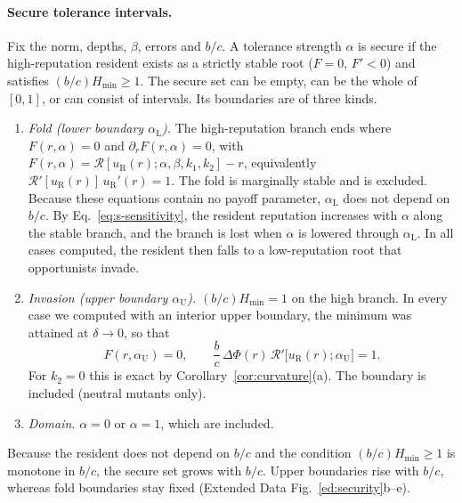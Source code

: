 \documentclass[fleqn,10pt]{wlscirep}
\newcommand{\Rmap}{\mathscr{R}}            %
\newcommand{\Hmin}{H_{\min}}
\theoremstyle{plain}
\begin{document}
\paragraph{Secure tolerance intervals.} Fix the norm, depths, $\beta$, errors and $b/c$. A tolerance strength $\alpha$ is secure if the high-reputation resident exists as a strictly stable root ($F=0$, $F'<0$) and satisfies $(b/c)\Hmin\geq1$. The secure set can be empty, can be the whole of $[0,1]$, or can consist of intervals. Its boundaries are of three kinds.
\begin{enumerate}
\item \textit{Fold (lower boundary $\alpha_{\mathrm L}$).} The high-reputation branch ends where $F(r,\alpha)=0$ and $\partial_rF(r,\alpha)=0$, with $F(r,\alpha)=\Rmap[u_{\mathrm R}(r);\alpha,\beta,k_1,k_2]-r$, equivalently $\Rmap'[u_{\mathrm R}(r)]\,u_{\mathrm R}'(r)=1$. The fold is marginally stable and is excluded. Because these equations contain no payoff parameter, $\alpha_{\mathrm L}$ does not depend on $b/c$. By Eq.~\eqref{eq:s-sensitivity}, the resident reputation increases with $\alpha$ along the stable branch, and the branch is lost when $\alpha$ is lowered through $\alpha_{\mathrm L}$. In all cases computed, the resident then falls to a low-reputation root that opportunists invade.
\item \textit{Invasion (upper boundary $\alpha_{\mathrm U}$).} $(b/c)\Hmin=1$ on the high branch. In every case we computed with an interior upper boundary, the minimum was attained at $\delta\to0$, so that
\begin{equation}
F(r,\alpha_{\mathrm U})=0,\qquad \frac{b}{c}\,\Delta\Phi(r)\,\Rmap'\bigl[u_{\mathrm R}(r);\alpha_{\mathrm U}\bigr]=1.
\label{eq:s-upper}
\end{equation}
For $k_2=0$ this is exact by Corollary~\ref{cor:curvature}(a). The boundary is included (neutral mutants only).
\item \textit{Domain.} $\alpha=0$ or $\alpha=1$, which are included.
\end{enumerate}
Because the resident does not depend on $b/c$ and the condition $(b/c)\Hmin\geq1$ is monotone in $b/c$, the secure set grows with $b/c$. Upper boundaries rise with $b/c$, whereas fold boundaries stay fixed (Extended Data Fig.~\ref{ed:security}b--e).
\end{document}
